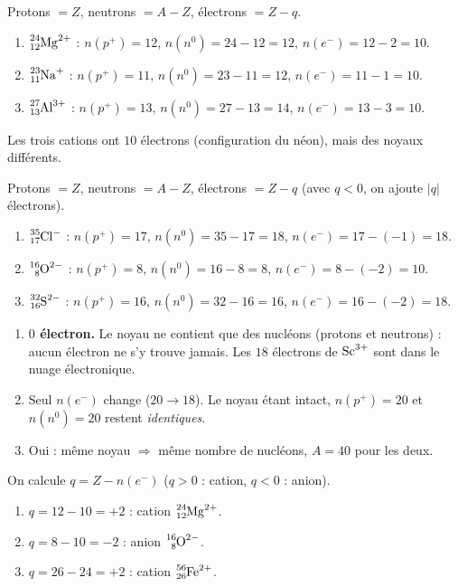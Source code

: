 \documentclass[11pt,a4paper]{article}
\begin{document}
\begin{corrige}
Protons $=Z$, neutrons $=A-Z$, électrons $=Z-q$.
\begin{enumerate}[label=\alph*)]
  \item $\ce{^{24}_{12}Mg^{2+}}$ : $n(p^+)=12$, $n(n^0)=24-12=12$, $n(e^-)=12-2=10$.
  \item $\ce{^{23}_{11}Na^{+}}$ : $n(p^+)=11$, $n(n^0)=23-11=12$, $n(e^-)=11-1=10$.
  \item $\ce{^{27}_{13}Al^{3+}}$ : $n(p^+)=13$, $n(n^0)=27-13=14$, $n(e^-)=13-3=10$.
\end{enumerate}
Les trois cations ont $10$ électrons (configuration du néon), mais des noyaux différents.
\end{corrige}

\begin{corrige}
Protons $=Z$, neutrons $=A-Z$, électrons $=Z-q$ (avec $q<0$, on ajoute $|q|$ électrons).
\begin{enumerate}[label=\alph*)]
  \item $\ce{^{35}_{17}Cl^{-}}$ : $n(p^+)=17$, $n(n^0)=35-17=18$, $n(e^-)=17-(-1)=18$.
  \item $\ce{^{16}_{8}O^{2-}}$ : $n(p^+)=8$, $n(n^0)=16-8=8$, $n(e^-)=8-(-2)=10$.
  \item $\ce{^{32}_{16}S^{2-}}$ : $n(p^+)=16$, $n(n^0)=32-16=16$, $n(e^-)=16-(-2)=18$.
\end{enumerate}
\end{corrige}

\begin{corrige}
\begin{enumerate}[label=\alph*)]
  \item \textbf{$0$ électron.} Le noyau ne contient que des nucléons (protons et neutrons) : aucun
        électron ne s'y trouve jamais. Les $18$ électrons de $\ce{Sc^{3+}}$ sont dans le nuage
        électronique.
  \item Seul $n(e^-)$ change ($20 \to 18$). Le noyau étant intact, $n(p^+)=20$ et $n(n^0)=20$ restent
        \emph{identiques}.
  \item Oui : même noyau $\Rightarrow$ même nombre de nucléons, $A=40$ pour les deux.
\end{enumerate}
\end{corrige}

\begin{corrige}
On calcule $q = Z - n(e^-)$ ($q>0$ : cation, $q<0$ : anion).
\begin{enumerate}[label=\alph*)]
  \item $q = 12 - 10 = +2$ : cation $\ce{^{24}_{12}Mg^{2+}}$.
  \item $q = 8 - 10 = -2$ : anion $\ce{^{16}_{8}O^{2-}}$.
  \item $q = 26 - 24 = +2$ : cation $\ce{^{56}_{26}Fe^{2+}}$.
\end{enumerate}
\end{corrige}
\end{document}
